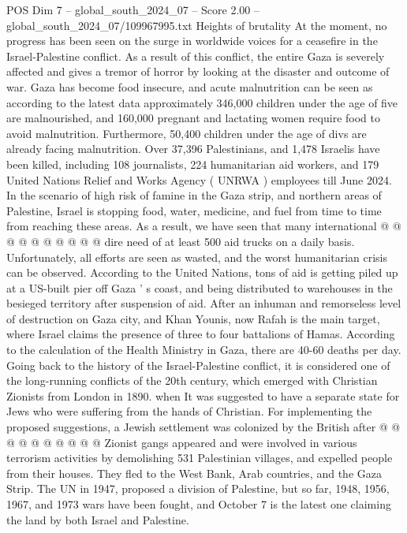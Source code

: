 \begin{textsample}{POS Dim 7 – global\_south\_2024\_07 – Score 2.00 – global\_south\_2024\_07/109967995.txt}  \label{ex:f7_pos_113}
Heights of brutality At the moment, no progress has been seen on the surge in worldwide voices for a ceasefire in the Israel-Palestine conflict.
As a result of this conflict, the entire Gaza is severely affected and gives a tremor of horror by looking at the disaster and outcome of war.
Gaza has become food insecure, and acute malnutrition can be seen as according to the latest data approximately 346,000 children under the age of five are malnourished, and 160,000 pregnant and lactating women require food to avoid malnutrition.
Furthermore, 50,400 children under the age of divs are already facing malnutrition.
Over 37,396 Palestinians, and 1,478 Israelis have been killed, including 108 journalists, 224 humanitarian aid workers, and 179 United Nations Relief and Works Agency ( UNRWA ) employees till June 2024.
In the scenario of high risk of famine in the Gaza strip, and northern areas of Palestine, Israel is stopping food, water, medicine, and fuel from time to time from reaching these areas.
As a result, we have seen that many international @ @ @ @ @ @ @ @ @ @ dire need of at least 500 aid trucks on a daily basis.
Unfortunately, all efforts are seen as wasted, and the worst humanitarian crisis can be observed.
According to the United Nations, tons of aid is getting piled up at a US-built pier off Gaza ' s coast, and being distributed to warehouses in the besieged territory after suspension of aid.
After an inhuman and remorseless level of destruction on Gaza city, and Khan Younis, now Rafah is the main target, where Israel claims the presence of three to four battalions of Hamas.
According to the calculation of the Health Ministry in Gaza, there are 40-60 deaths per day.
Going back to the history of the Israel-Palestine conflict, it is considered one of the long-running conflicts of the 20th century, which emerged with Christian Zionists from London in 1890. when It was suggested to have a separate state for Jews who were suffering from the hands of Christian.
For implementing the proposed suggestions, a Jewish settlement was colonized by the British after @ @ @ @ @ @ @ @ @ @ Zionist gangs appeared and were involved in various terrorism activities by demolishing 531 Palestinian villages, and expelled people from their houses.
They fled to the West Bank, Arab countries, and the Gaza Strip.
The UN in 1947, proposed a division of Palestine, but so far, 1948, 1956, 1967, and 1973 wars have been fought, and October 7 is the latest one claiming the land by both Israel and Palestine.

\end{textsample}
